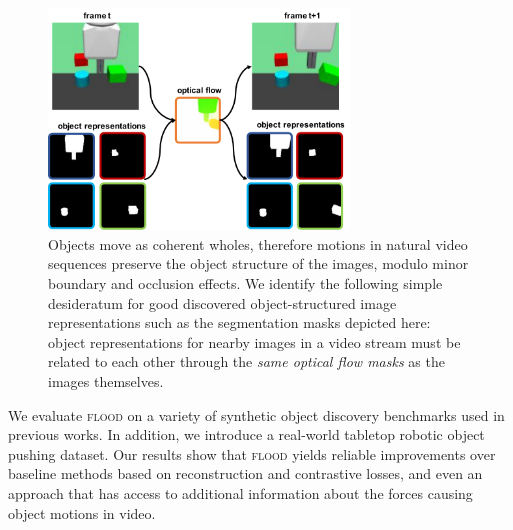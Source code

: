 \documentclass{article}
\begin{document}
\begin{figure}
    \centering
    \includegraphics[width=8cm]{flood_main_figure.pdf}
    \caption{Objects move as coherent wholes, therefore motions in natural video sequences preserve the object structure of the images, modulo minor boundary and occlusion effects. We identify the following simple desideratum for good discovered object-structured image representations such as the segmentation masks depicted here: object representations for nearby images in a video stream must be related to each other through the \emph{same optical flow masks} as the images themselves.}
    \label{fig:desired_property}
\end{figure}

We evaluate \textsc{flood} on a variety of synthetic object discovery benchmarks used in previous works. In addition, we introduce a real-world tabletop robotic object pushing dataset. Our results show that \textsc{flood} yields reliable improvements over baseline methods based on reconstruction and contrastive losses, and even an approach that has access to additional information about the forces causing object motions in video.








\end{document}
